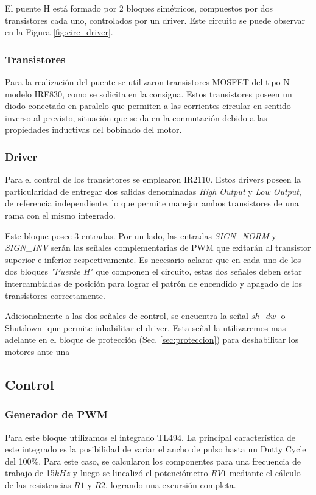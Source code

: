 \documentclass[11pt, a4paper]{article}
\begin{document}
El puente H está formado por 2 bloques simétricos, compuestos por dos transistores cada uno, controlados por un driver. Este circuito se puede observar en la Figura \ref{fig:circ_driver}.

\subsubsection{Transistores}

Para la realización del puente se utilizaron transistores MOSFET del tipo N modelo IRF830, como se solicita en la consigna. Estos transistores poseen un diodo conectado en paralelo que permiten a las corrientes circular en sentido inverso al previsto, situación que se da en la conmutación debido a las propiedades inductivas del bobinado del motor.

\subsubsection{Driver}
Para el control de los transistores se emplearon IR2110. Estos drivers poseen la particularidad de entregar dos salidas denominadas \textit{High Output} y \textit{Low Output}, de referencia independiente, lo que permite manejar ambos transistores de una rama con el mismo integrado.

Este bloque posee 3 entradas. Por un lado, las entradas \textit{SIGN\_NORM} y \textit{SIGN\_INV} serán las señales complementarias de PWM que exitarán al transistor superior e inferior respectivamente. Es necesario aclarar que en cada uno de los dos bloques \textit{"Puente H"} que componen el circuito, estas dos señales deben estar intercambiadas de posición para lograr el patrón de encendido y apagado de los transistores correctamente.

Adicionalmente a las dos señales de control, se encuentra la señal \textit{sh\_dw} -o Shutdown- que permite inhabilitar el driver. Esta señal la utilizaremos mas adelante en el bloque de protección (Sec. \ref{sec:proteccion}) para deshabilitar los motores ante una 
\textit{}


\subsection{Control}
\subsubsection{Generador de PWM}

Para este bloque utilizamos el integrado TL494. La principal característica de este integrado es la posibilidad de variar el ancho de pulso hasta un Dutty Cycle del 100\%. Para este caso, se calcularon los componentes para una frecuencia de trabajo de 15$kHz$ y luego se linealizó el potenciómetro $RV1$ mediante el cálculo de las resistencias $R1$ y $R2$, logrando una excursión completa.
\end{document}
